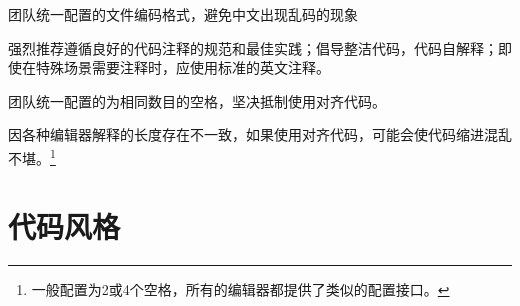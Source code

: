 \begin{content}
\begin{regulation}
团队统一配置的文件编码格式，避免中文出现乱码的现象
\end{regulation}

强烈推荐遵循良好的代码注释的规范和最佳实践；倡导整洁代码，代码自解释；即使在特殊场景需要注释时，应使用标准的英文注释。

\begin{regulation}
团队统一配置的为相同数目的空格，坚决抵制使用对齐代码。
\end{regulation}

因各种编辑器解释的长度存在不一致，如果使用对齐代码，可能会使代码缩进混乱不堪。\footnote{一般配置为2或4个空格，所有的编辑器都提供了类似的配置接口。}

\end{content}

\section{代码风格}

